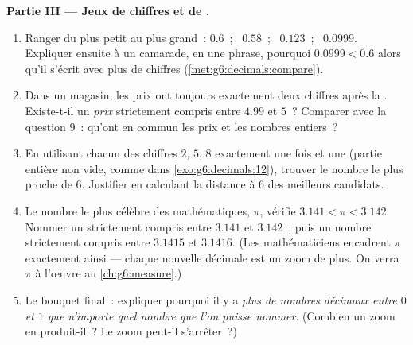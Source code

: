 \begin{problem}
\medskip
\noindent\textbf{Partie III --- Jeux de chiffres et de .}
\begin{enumerate}[resume]
  \item Ranger du plus petit au plus grand~: $0.6$~; \ $0.58$~; \
        $0.123$~; \ $0.0999$. Expliquer ensuite à un camarade, en une
        phrase, pourquoi $0.0999 < 0.6$ alors qu'il s'écrit avec plus
        de chiffres (\cref{met:g6:decimals:compare}).
  \item Dans un magasin, les prix ont toujours exactement deux
        chiffres après la . Existe-t-il un \emph{prix}
        strictement compris entre $4.99$ et $5$~? Comparer avec la
        question 9~: qu'ont en commun les prix et les nombres
        entiers~?
  \item En utilisant chacun des chiffres $2$, $5$, $8$ exactement une
        fois et une \omterm{def:g4:decimals:point}{virgule} (partie entière non vide, comme dans
        \cref{exo:g6:decimals:12}), trouver le nombre le plus proche
        de $6$. Justifier en calculant la distance à $6$ des
        meilleurs candidats.
  \item Le nombre le plus célèbre des mathématiques, $\pi$, vérifie
        $3.141 < \pi < 3.142$. Nommer un  strictement
        compris entre $3.141$ et $3.142$~; puis un nombre strictement
        compris entre $3.1415$ et $3.1416$. (Les mathématiciens
        encadrent $\pi$ exactement ainsi --- chaque nouvelle décimale
        est un zoom de plus. On verra $\pi$ à l'œuvre au
        \cref{ch:g6:measure}.)
  \item Le bouquet final~: expliquer pourquoi il y a \emph{plus de
        nombres décimaux entre $0$ et $1$ que n'importe quel nombre
        que l'on puisse nommer}. (Combien un zoom en produit-il~? Le
        zoom peut-il s'arrêter~?)
\end{enumerate}
\end{problem}
